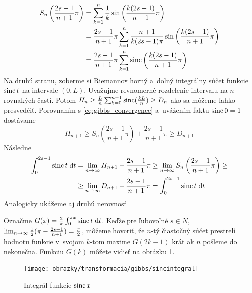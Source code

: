 \begin{dokaz}
    \begin{equation}
        \begin{split}
        S_n\left(\frac{2s-1}{n+1}\pi\right) &=
            \sum_{k=1}^n \frac{1}{k}
            \sin\left(\frac{k(2s-1)}{n+1}\pi\right) \\
            &=
         \frac{2s-1}{n+1}\pi    
            \sum_{k=1}^n \frac{n+1}{k(2s-1)\pi}
            \sin\left(\frac{k(2s-1)}{n+1}\pi\right) \\
            &=
         \frac{2s-1}{n+1}\pi    
            \sum_{k=1}^n \operatorname{sinc}\left( \frac{k(2s-1)}{n+1} \pi \right)            
        \end{split}
        \label{eq:gibbs_convergence}
    \end{equation}
    Na druhú stranu, zoberme si Riemannov horný a~dolný
    integrálny súčet funkcie $\operatorname{sinc} t$ na intervale $(0,L)$.
    Uvažujme rovnomerné rozdelenie intervalu na $n$ rovnakých častí.
    Potom $H_n \ge \frac{L}{n} \sum_{k=0}^{n-1} \operatorname{sinc}(\frac{k L}{n}) \ge D_n$
    ako sa môžeme ľahko presvedčiť.
    Porovnaním s \eqref{eq:gibbs_convergence} a~uvážením faktu
    $\operatorname{sinc} 0 =1$ dostávame
    \begin{equation*}
        H_{n+1} \ge S_n\left(\frac{2s-1}{n+1}\pi\right) +
        \frac{2s-1}{n+1}\pi \ge D_{n+1}
    \end{equation*}
    Následne
    \begin{equation*}
        \begin{split}
       \int_0^{2s-1} \operatorname{sinc} t \; \mathrm{d} t &= 
       \lim_{n \rightarrow \infty} H_{n+1} - \frac{2s-1}{n+1}\pi \ge 
       \lim_{n \rightarrow \infty} S_n\left(\frac{2s-1}{n+1}\pi\right) \ge \\
       &\ge
       \lim_{n \rightarrow \infty} D_{n+1} - \frac{2s-1}{n+1}\pi =
       \int_0^{2s-1} \operatorname{sinc} t \; \mathrm{d} t                     
      \end{split}
    \end{equation*}
    Analogicky ukážeme aj druhú nerovnosť    
\end{dokaz}

Označme $G(x) = \frac{2}{\pi} \int_0^{\pi x} \operatorname{sinc} t \; \mathrm{d} t$.
Keďže pre ľubovoľné $s\in N$, $\lim_{n \rightarrow \infty} \frac{1}{2} (\pi -
\frac{2s-1}{n+1} )=\frac{\pi}{2}$, môžeme hovoriť, že
$n$-tý čiastočný súčet prestrelí hodnotu funkcie
v~svojom $k$-tom maxime $G(2k-1)$ krát ak
$n$ pošleme do nekonečna.
Funkciu $G(k)$ môžete vidieť na obrázku \ref{fig:gibbs_sincint}.

\begin{figure}[htp]
    \centering
    \texttt{[image: obrazky/transformacia/gibbs/sincintegral]}
    \caption{Integrál funkcie $\operatorname{sinc} x$}
    \label{fig:gibbs_sincint}
\end{figure}


